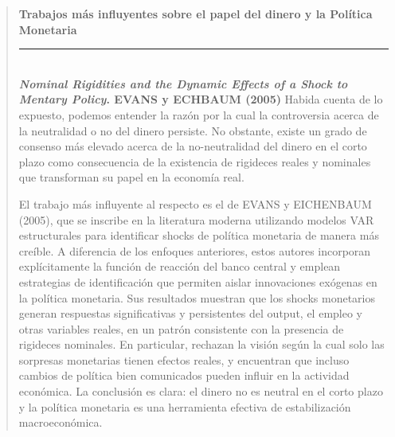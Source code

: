 \documentclass[10pt,a4paper]{article}
\newenvironment{specialblock}[1]{%
      \begin{quote} %
      \small %
      \noindent\textbf{#1}\\[-0.3em] %
      \rule{\linewidth}{0.4pt}\\[0.6em]}{
      \end{quote}}
\begin{document}
\begin{specialblock}{Trabajos más influyentes sobre el papel del dinero y la Política Monetaria}
    \textbf{\textit{Nominal Rigidities and the Dynamic Effects of a Shock to Mentary Policy}. EVANS y ECHBAUM (2005)}
    Habida cuenta de lo expuesto, podemos entender la razón por la cual la controversia acerca de la neutralidad o no del dinero persiste. No obstante, existe un grado de consenso más elevado acerca de la no-neutralidad del dinero en el corto plazo como consecuencia de la existencia de rigideces reales y nominales que transforman su papel en la economía real. 
    
    El trabajo más influyente al respecto es el de EVANS y EICHENBAUM (2005), que se inscribe en la literatura moderna utilizando modelos VAR estructurales para identificar shocks de política monetaria de manera más creíble. A diferencia de los enfoques anteriores, estos autores incorporan explícitamente la función de reacción del banco central y emplean estrategias de identificación que permiten aislar innovaciones exógenas en la política monetaria. Sus resultados muestran que los shocks monetarios generan respuestas significativas y persistentes del output, el empleo y otras variables reales, en un patrón consistente con la presencia de rigideces nominales. En particular, rechazan la visión según la cual solo las sorpresas monetarias tienen efectos reales, y encuentran que incluso cambios de política bien comunicados pueden influir en la actividad económica. La conclusión es clara: el dinero no es neutral en el corto plazo y la política monetaria es una herramienta efectiva de estabilización macroeconómica.


\end{specialblock}
\end{document}
